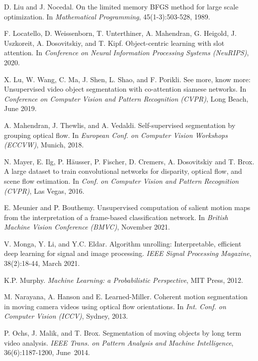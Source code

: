 \documentclass[10pt,twocolumn,letterpaper]{article}
\begin{document}
\begin{thebibliography}{28}
D. Liu and J. Nocedal.
\newblock On the limited memory BFGS method for large scale optimization.
\newblock In \emph{Mathematical Programming}, 45(1-3):503-528, 1989.

F. Locatello, D. Weissenborn, T. Unterthiner, A. Mahendran,
G. Heigold, J. Uszkoreit, A. Dosovitskiy, and T. Kipf.
\newblock Object-centric learning with slot attention.
\newblock In \emph{Conference on Neural Information Processing Systems (NeuRIPS)}, 2020.

X. Lu, W. Wang, C. Ma, J. Shen, L. Shao, and F. Porikli.
\newblock See more, know more: Unsupervised video object segmentation with co-attention siamese networks.
\newblock In \emph{Conference on Computer Vision and Pattern Recognition (CVPR)}, Long Beach, June 2019.

A. Mahendran, J. Thewlis, and A. Vedaldi.
\newblock Self-supervised segmentation by grouping optical flow.
\newblock In \emph{European Conf. on Computer Vision Workshops (ECCVW)}, Munich, 2018.

N. Mayer, E. Ilg, P. H{\"a}usser, P. Fischer, D. Cremers, A. Dosovitskiy and T. Brox.
\newblock A large dataset to train convolutional networks for disparity, optical flow, and scene flow estimation.
\newblock In \emph{Conf. on Computer Vision and Pattern Recognition (CVPR)}, Las Vegas, 2016.

E. Meunier and P. Bouthemy.
\newblock Unsupervised computation of salient motion maps from the interpretation of a frame-based classification network.
\newblock In \emph{British Machine Vision Conference (BMVC)}, November 2021.

V. Monga, Y. Li, and Y.C. Eldar.
\newblock Algorithm unrolling: Interpretable, efficient deep learning for signal and image processing.
\newblock \emph{IEEE Signal Processing Magazine}, 38(2):18-44, March 2021.

K.P. Murphy.
\newblock \emph{Machine Learning: a Probabilistic Perspective},
\newblock MIT Press, 2012.

M. Narayana, A. Hanson and E. Learned-Miller.
\newblock Coherent motion segmentation in moving camera videos using optical flow orientations.
\newblock In \emph{Int. Conf. on Computer Vision (ICCV)}, Sydney, 2013.



P. Ochs, J. Malik, and T. Brox.
\newblock Segmentation of moving objects by long term video analysis.
\newblock \emph{IEEE Trans. on Pattern Analysis and Machine Intelligence}, 36(6):1187-1200, June~2014.


\end{thebibliography}
\end{document}
